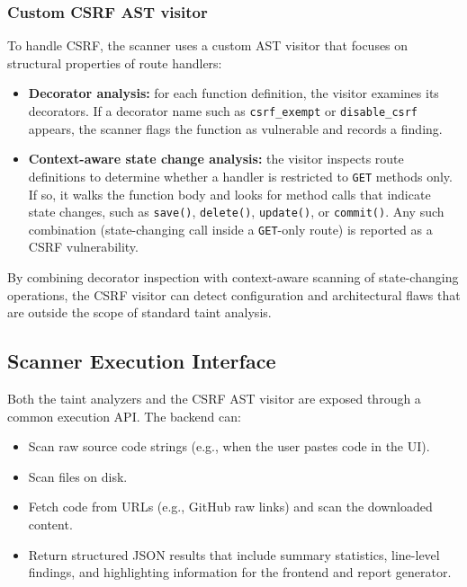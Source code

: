 \subsubsection{Custom CSRF AST visitor}
\label{sec:static_csrf_visitor}

To handle CSRF, the scanner uses a custom AST visitor that focuses on structural properties of route handlers:

\begin{itemize}
  \item \textbf{Decorator analysis:} for each function definition, the visitor examines its decorators. If a decorator name such as \texttt{csrf\_exempt} or \texttt{disable\_csrf} appears, the scanner flags the function as vulnerable and records a finding.
  \item \textbf{Context-aware state change analysis:} the visitor inspects route definitions to determine whether a handler is restricted to \texttt{GET} methods only. If so, it walks the function body and looks for method calls that indicate state changes, such as \texttt{save()}, \texttt{delete()}, \texttt{update()}, or \texttt{commit()}. Any such combination (state-changing call inside a \texttt{GET}-only route) is reported as a CSRF vulnerability.
\end{itemize}

By combining decorator inspection with context-aware scanning of state-changing operations, the CSRF visitor can detect configuration and architectural flaws that are outside the scope of standard taint analysis.

\subsection{Scanner Execution Interface}
\label{sec:static_execution_api}

Both the taint analyzers and the CSRF AST visitor are exposed through a common execution API. The backend can:
\begin{itemize}
  \item Scan raw source code strings (e.g., when the user pastes code in the UI).
  \item Scan files on disk.
  \item Fetch code from URLs (e.g., GitHub raw links) and scan the downloaded content.
  \item Return structured JSON results that include summary statistics, line-level findings, and highlighting information for the frontend and report generator.
\end{itemize}

